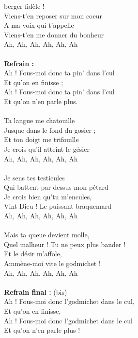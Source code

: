 
 berger fidèle !
\\Viens-t'en reposer sur mon coeur
\\A ma voix qui t'appelle
\\Viens-t'en me donner du bonheur
\\Ah, Ah, Ah, Ah, Ah, Ah
\\\\\textbf{Refrain :}
\\Ah ! Fous-moi donc ta pin' dans l'cul
\\Et qu'on en finisse ;
\\Ah ! Fous-moi donc ta pin' dans l'cul
\\Et qu'on n'en parle plus.
\\\\Ta langue me chatouille
\\Jusque dans le fond du gosier ;
\\Et ton doigt me trifouille
\\Je crois qu'il atteint le gésier
\\Ah, Ah, Ah, Ah, Ah, Ah
\\\\Je sens tes testicules
\\Qui battent par dessus mon pétard 
\\Je crois bien qu'tu m'encules,
\\Vint Dieu ! Le puissant braquemard
\\Ah, Ah, Ah, Ah, Ah, Ah
\\\\Mais ta queue devient molle,
\\Quel malheur ! Tu ne peux plus bander ! 
\\Et le désir m'affole,
\\Ammène-moi vite le godmichet ! 
\\Ah, Ah, Ah, Ah, Ah, Ah
\\\\\textbf{Refrain final :} (bis)
\\Ah ! Fous-moi donc l'godmichet dans le cul,
\\Et qu'on en finisse,
\\Ah ! Fous-moi donc l'godmichet dans le cul
\\Et qu'on n'en parle plus !

\breakpage